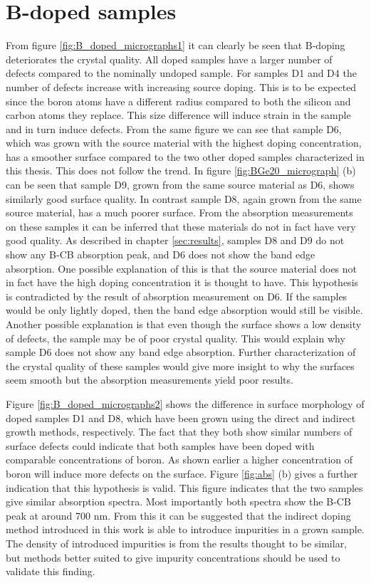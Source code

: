 \section{B-doped samples}
From figure \ref{fig:B_doped_micrographs1} it can clearly be seen that B-doping deteriorates the crystal quality. All doped samples have a larger number of defects compared to the nominally undoped sample. For samples D1 and D4 the number of defects increase with increasing source doping. This is to be expected since the boron atoms have a different radius compared to both the silicon and carbon atoms they replace. This size difference will induce strain in the sample and in turn induce defects. From the same figure we can see that sample D6, which was grown with the source material with the highest doping concentration, has a smoother surface compared to the two other doped samples characterized in this thesis. This does not follow the trend. In figure \ref{fig:BGe20_micrograph} (b) can be seen that sample D9, grown from the same source material as D6, shows similarly good surface quality. In contrast sample D8, again grown from the same source material, has a much poorer surface. From the absorption measurements on these samples it can be inferred that these materials do not in fact have very good quality. As described in chapter \ref{sec:results}, samples D8 and D9 do not show any B-CB absorption peak, and D6 does not show the band edge absorption. One possible explanation of this is that the source material does not in fact have the high doping concentration it is thought to have. This hypothesis is contradicted by the result of absorption measurement on D6. If the samples would be only lightly doped, then the band edge absorption would still be visible. Another possible explanation is that even though the surface shows a low density of defects, the sample may be of poor crystal quality. This would explain why sample D6 does not show any band edge absorption. Further characterization of the crystal quality of these samples would give more insight to why the surfaces seem smooth but the absorption measurements yield poor results. 

Figure \ref{fig:B_doped_micrographs2} shows the difference in surface morphology of doped samples D1 and D8, which have been grown using the direct and indirect growth methods, respectively. The fact that they both show similar numbers of surface defects could indicate that both samples have been doped with comparable concentrations of boron. As shown earlier a higher concentration of boron will induce more defects on the surface. Figure \ref{fig:abs} (b) gives a further indication that this hypothesis is valid. This figure indicates that the two samples give similar absorption spectra. Most importantly both spectra show the B-CB peak at around 700 nm. From this it can be suggested that the indirect doping method introduced in this work is able to introduce impurities in a grown sample. The density of introduced impurities is from the results thought to be similar, but methods better suited to give impurity concentrations should be used to validate this finding. 

